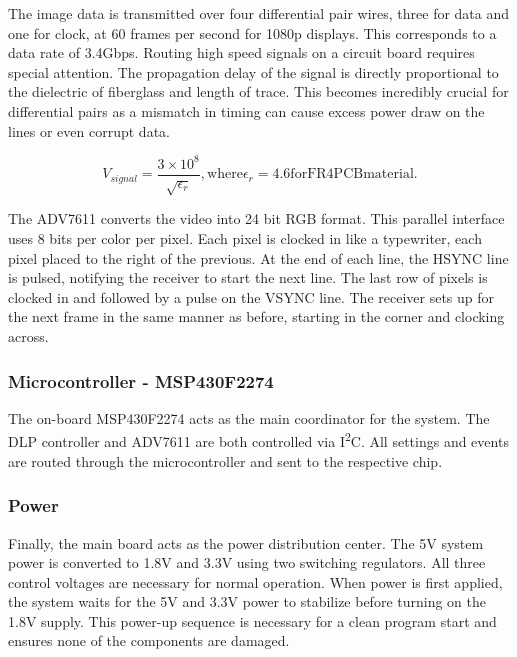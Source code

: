 \documentclass[12pt,a4paper]{article}
\begin{document}
The image data is transmitted over four differential pair wires, three for data and one for clock, at 60 frames per second for 1080p displays. This corresponds to a data rate of 3.4Gbps. Routing high speed signals on a circuit board requires special attention. The propagation delay of the signal is directly proportional to the dielectric of fiberglass and length of trace. This becomes incredibly crucial for differential pairs as a mismatch in timing can cause excess power draw on the lines or even corrupt data. 

\begin{equation}
	V_{signal}  = \frac{ 3 \times 10^{8} }{\sqrt{\epsilon_r}}  \mathrm{ , where }\epsilon_r = 4.6 \mathrm{for FR4 PCB material.}  
\end{equation}
%


The ADV7611 converts the video into 24 bit RGB format. This parallel interface uses 8 bits per color per pixel. Each pixel is clocked in like a typewriter, each pixel placed to the right of the previous. At the end of each line, the HSYNC line is pulsed, notifying the receiver to start the next line. The last row of pixels is clocked in and followed by a pulse on the VSYNC line. The receiver sets up for the next frame in the same manner as before, starting in the corner and clocking across.



\subsubsection{Microcontroller - MSP430F2274}
The on-board MSP430F2274 acts as the main coordinator for the system. The DLP controller and ADV7611 are both controlled via I\textsuperscript{2}C. All settings and events are routed through the microcontroller and sent to the respective chip. 

\subsubsection{Power}
Finally, the main board acts as the power distribution center. The 5V system power is converted to 1.8V and 3.3V using two switching regulators. All three control voltages are necessary for normal operation. When power is first applied, the system waits for the 5V and 3.3V power to stabilize before turning on the 1.8V supply. This power-up sequence is necessary for a clean program start and ensures none of the components are damaged. 
\end{document}
